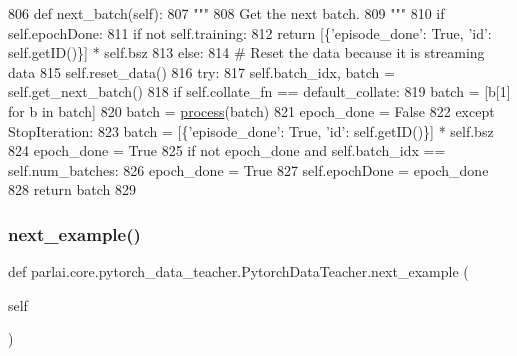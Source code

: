 \begin{DoxyCode}
806     \textcolor{keyword}{def }next\_batch(self):
807         \textcolor{stringliteral}{"""}
808 \textcolor{stringliteral}{        Get the next batch.}
809 \textcolor{stringliteral}{        """}
810         \textcolor{keywordflow}{if} self.epochDone:
811             \textcolor{keywordflow}{if} \textcolor{keywordflow}{not} self.training:
812                 \textcolor{keywordflow}{return} [\{\textcolor{stringliteral}{'episode\_done'}: \textcolor{keyword}{True}, \textcolor{stringliteral}{'id'}: self.getID()\}] * self.bsz
813             \textcolor{keywordflow}{else}:
814                 \textcolor{comment}{# Reset the data because it is streaming data}
815                 self.reset\_data()
816         \textcolor{keywordflow}{try}:
817             self.batch\_idx, batch = self.get\_next\_batch()
818             \textcolor{keywordflow}{if} self.collate\_fn == default\_collate:
819                 batch = [b[1] \textcolor{keywordflow}{for} b \textcolor{keywordflow}{in} batch]
820             batch = \hyperlink{namespaceparlai_1_1core_1_1pytorch__data__teacher_a7b71207eb86027bc93809c1e4d57f641}{process}(batch)
821             epoch\_done = \textcolor{keyword}{False}
822         \textcolor{keywordflow}{except} StopIteration:
823             batch = [\{\textcolor{stringliteral}{'episode\_done'}: \textcolor{keyword}{True}, \textcolor{stringliteral}{'id'}: self.getID()\}] * self.bsz
824             epoch\_done = \textcolor{keyword}{True}
825         \textcolor{keywordflow}{if} \textcolor{keywordflow}{not} epoch\_done \textcolor{keywordflow}{and} self.batch\_idx == self.num\_batches:
826             epoch\_done = \textcolor{keyword}{True}
827         self.epochDone = epoch\_done
828         \textcolor{keywordflow}{return} batch
829 
\end{DoxyCode}
\mbox{\label{classparlai_1_1core_1_1pytorch__data__teacher_1_1PytorchDataTeacher_a62003fefcf480fb16038acb7e40b4f15}} 
\subsubsection{\texorpdfstring{next\+\_\+example()}{next\_example()}}
{\footnotesize\ttfamily def parlai.\+core.\+pytorch\+\_\+data\+\_\+teacher.\+Pytorch\+Data\+Teacher.\+next\+\_\+example (\begin{DoxyParamCaption}\item[{}]{self }\end{DoxyParamCaption})}

